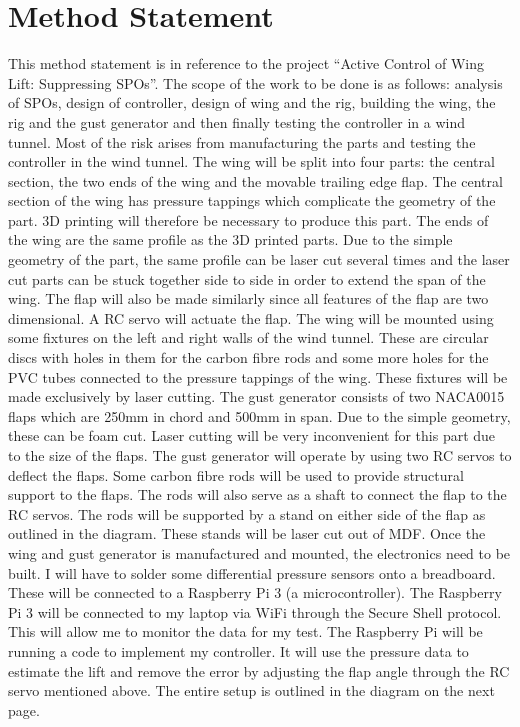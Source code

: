 \chapter{Method Statement}
\thispagestyle{fancy}
This method statement is in reference to the project “Active Control of Wing Lift: Suppressing SPOs”. The scope of the work to be done is as follows: analysis of SPOs, design of controller, design of wing and the rig, building the wing, the rig and the gust generator and then finally testing the controller in a wind tunnel.
\newline
\newline
Most of the risk arises from manufacturing the parts and testing the controller in the wind tunnel. The wing will be split into four parts: the central section, the two ends of the wing and the movable trailing edge flap. The central section of the wing has pressure tappings which complicate the geometry of the part. 3D printing will therefore be necessary to produce this part. The ends of the wing are the same profile as the 3D printed parts. Due to the simple geometry of the part, the same profile can be laser cut several times and the laser cut parts can be stuck together side to side in order to extend the span of the wing. The flap will also be made similarly since all features of the flap are two dimensional. A RC servo will actuate the flap.
The wing will be mounted using some fixtures on the left and right walls of the wind tunnel. These are circular discs with holes in them for the carbon fibre rods and some more holes for the PVC tubes connected to the pressure tappings of the wing. These fixtures will be made exclusively by laser cutting.
\newline
\newline
The gust generator consists of two NACA0015 flaps which are 250mm in chord and 500mm in span. Due to the simple geometry, these can be foam cut. Laser cutting will be very inconvenient for this part due to the size of the flaps. The gust generator will operate by using two RC servos to deflect the flaps. Some carbon fibre rods will be used to provide structural support to the flaps. The rods will also serve as a shaft to connect the flap to the RC servos. The rods will be supported by a stand on either side of the flap as outlined in the diagram. These stands will be laser cut out of MDF.
\newline
\newline
Once the wing and gust generator is manufactured and mounted, the electronics need to be built. I will have to solder some differential pressure sensors onto a breadboard. These will be connected to a Raspberry Pi 3 (a microcontroller). The Raspberry Pi 3 will be connected to my laptop via WiFi through the Secure Shell protocol. This will allow me to monitor the data for my test. The Raspberry Pi will be running a code to implement my controller. It will use the pressure data to estimate the lift and remove the error by adjusting the flap angle through the RC servo mentioned above. The entire setup is outlined in the diagram on the next page.
